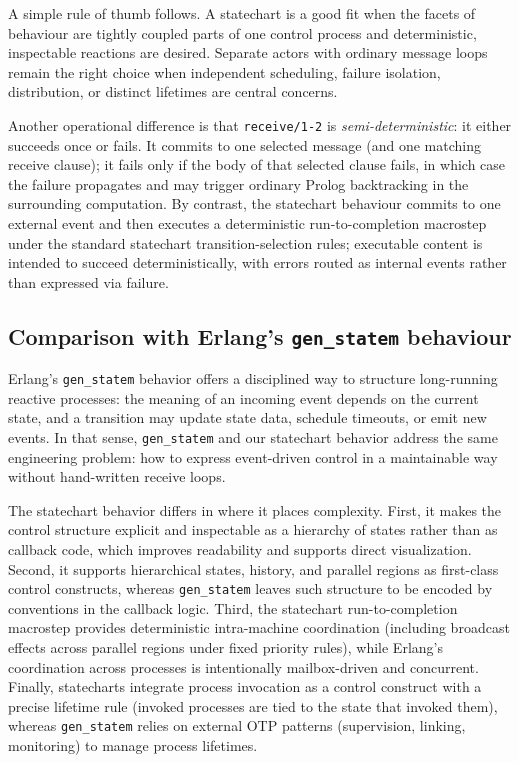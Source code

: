 A simple rule of thumb follows. A statechart is a good fit when the facets of behaviour are tightly coupled parts of one control process and deterministic, inspectable reactions are desired. Separate actors with ordinary message loops remain the right choice when independent scheduling, failure isolation, distribution, or distinct lifetimes are central concerns.


Another operational difference is that \texttt{receive/1-2} is \emph{semi-deterministic}: it either succeeds once or fails. It commits to one selected message (and one matching receive clause); it fails only if the body of that selected clause fails, in which case the failure propagates and may trigger ordinary Prolog backtracking in the surrounding computation. By contrast, the statechart behaviour commits to one external event and then executes a deterministic run-to-completion macrostep under the standard statechart transition-selection rules; executable content is intended to succeed deterministically, with errors routed as internal events rather than expressed via failure.


\subsection{Comparison with Erlang's \texttt{gen\_statem} behaviour}\label{sec:comparison-genstatem}

Erlang's \texttt{gen\_statem} behavior offers a disciplined way to structure long-running reactive processes: the meaning of an incoming event depends on the current state, and a transition may update state data, schedule timeouts, or emit new events. In that sense, \texttt{gen\_statem} and our statechart behavior address the same engineering problem: how to express event-driven control in a maintainable way without hand-written receive loops.

The statechart behavior differs in where it places complexity. First, it makes the control structure explicit and inspectable as a hierarchy of states rather than as callback code, which improves readability and supports direct visualization. Second, it supports hierarchical states, history, and parallel regions as first-class control constructs, whereas \texttt{gen\_statem} leaves such structure to be encoded by conventions in the callback logic. Third, the statechart run-to-completion macrostep provides deterministic intra-machine coordination (including broadcast effects across parallel regions under fixed priority rules), while Erlang's coordination across processes is intentionally mailbox-driven and concurrent. Finally, statecharts integrate process invocation as a control construct with a precise lifetime rule (invoked processes are tied to the state that invoked them), whereas \texttt{gen\_statem} relies on external OTP patterns (supervision, linking, monitoring) to manage process lifetimes.

